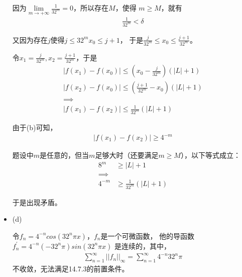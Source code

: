 \documentclass{article}
\begin{document}
\begin{itemize}
        因为$\lim\limits_{m \to +\infty} \frac{1}{32^m} = 0$，所以存在$M$，使得
        $m \geq M$，就有
        \begin{align*}
          \frac{1}{32^m} < \delta
        \end{align*}

        又因为存在$j$使得$j \leq 32^mx_0 \leq j + 1$，
        于是$\frac{j}{32^m} \leq x_0 \leq \frac{j + 1}{32^m}$。

        令$x_1 = \frac{j}{32^m}, x_2 = \frac{j + 1}{32^m}$，于是
        \begin{align*}
          |f(x_1) - f(x_0)| \leq (x_0 - \frac{j}{32^m})(|L| + 1)   \\
          |f(x_2) - f(x_0)| \leq (\frac{j+1}{32^m} - x_0)(|L| + 1) \\
          \implies                                                 \\
          |f(x_1) - f(x_2)| \leq \frac{1}{32^m}(|L| + 1)
        \end{align*}

        由于(b)可知，
        \begin{align*}
          |f(x_1) - f(x_2)| \geq 4^{-m}
        \end{align*}

        题设中$m$是任意的，但当$m$足够大时（还要满足$m \geq M$），以下等式成立：
        \begin{align*}
          8^m    & \geq |L| + 1                 \\
          \implies                              \\
          4^{-m} & \geq \frac{1}{32^m}(|L| + 1)
        \end{align*}

        于是出现矛盾。

  \item (d)

        令$f_n = 4^{-n} cos(32^n \pi x)$，$f_n$是一个可微函数，
        他的导函数$f_n^\prime = 4^{-n} (-32^n \pi) sin(32^n \pi x)$
        是连续的，其中，
        \begin{align*}
          \sum \limits_{n = 1}^{\infty} ||f_n||_{\infty} = \sum \limits_{n = 1}^{\infty} 4^{-n} 32^n \pi
        \end{align*}
        不收敛，无法满足14.7.3的前置条件。

\end{itemize}
\end{document}
